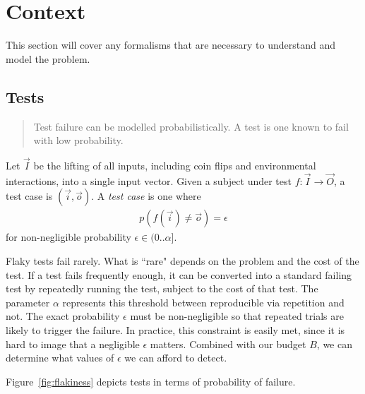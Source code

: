 \section{Context}
\label{sec:context}

This section will cover any formalisms that are necessary to understand and model the problem.

\subsection{\Flaky Tests}
\label{sec:sec:flaky_tests}

\begin{quote}
	Test failure can be modelled probabilistically. A \flaky test is one known to fail with low probability.
\end{quote}


\begin{defn}
  \label{def:flaky_test}

Let $\vec{I}$ be the lifting of all inputs, including coin flips and
environmental interactions, into a single input vector. Given a subject
under test $f: \vec{I} \rightarrow \vec{O}$, a test case is
$(\vec{i},\vec{o})$. A \emph{\flaky test case} is one
where
%
\begin{align*}
  p(f(\vec{i}) \ne \vec{o}) = \epsilon
\end{align*}
%
for non-negligible probability $\epsilon \in (0..\alpha]$.

\end{defn}

Flaky tests fail rarely.  What is “rare" depends on the problem and the cost of
the test.  If a test fails frequently enough, it can be converted into a
standard failing test by repeatedly running the test, subject to the cost of
that test.  The parameter $\alpha$ represents this threshold between
reproducible via repetition and not.  The exact probability $\epsilon$ must be
non-negligible so that repeated trials are likely to trigger the failure.  In
practice, this constraint is easily met, since it is hard to image that a
negligible $\epsilon$ matters.  Combined with our budget $B$, we can determine
what values of $\epsilon$ we can afford to detect. 

Figure~\ref{fig:flakiness} depicts \flaky tests in terms of probability of
failure.

